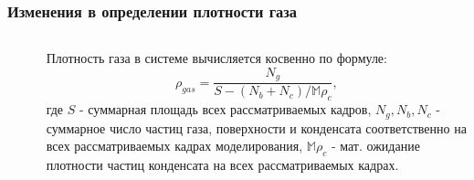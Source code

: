 \documentclass[pdf,hyperref={unicode}]{beamer}
\begin{document}
\begin{frame}
\begin{columns}
\begin{column}{0.4\linewidth}
{
\begin{figure}[h]
\end{figure}
}
\end{column}

\end{columns}
\end{frame}




\begin{frame}
\transdissolve[duration=0.2]
\frametitle{Изменения в определении плотности газа}
\begin{columns}


\begin{column}{0.55\linewidth}
{
\begin{figure}[h]
\end{figure}
}
\end{column}

\begin{column}{0.4\linewidth}
{
\tiny{
Плотность газа в системе вычисляется косвенно по формуле:
\begin{equation}
\rho_{gas} = \frac{N_{g}}{S - (N_{b} + N_{c}) / \mathbb{M}\rho_c},
\label{eqGas}
\end{equation}
где $S$ - суммарная площадь всех рассматриваемых кадров, $N_g, N_b, N_c$ - суммарное число частиц газа, поверхности и конденсата соответственно на всех рассматриваемых кадрах моделирования, $\mathbb{M}\rho_c$ - мат. ожидание плотности частиц конденсата на всех рассматриваемых кадрах.
}
}
\end{column}

\end{columns}
\end{frame}
\end{document}
